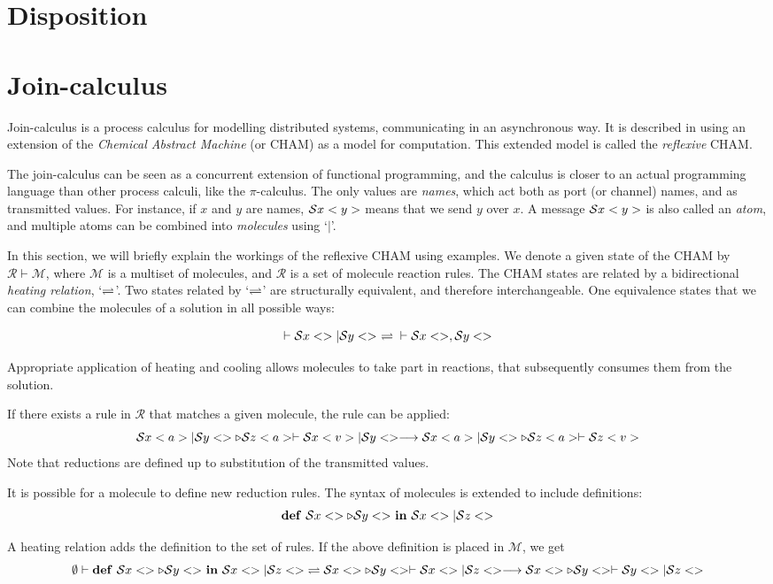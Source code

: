 \section{Disposition}


\section{Join-calculus}

Join-calculus is a process calculus for modelling distributed systems,
communicating in an asynchronous way. It is described in
\cite{fournet1996reflexive} using an extension of the \emph{Chemical Abstract
Machine}\cite{berry1989chemical} (or CHAM) as a model for computation. This
extended model is called the \emph{reflexive} CHAM.

The join-calculus can be seen as a concurrent extension of functional
programming, and the calculus is closer to an actual programming language than
other process calculi, like the $\pi$-calculus. The only values are
\emph{names}, which act both as port (or channel) names, and as transmitted
values. For instance, if $x$ and $y$ are names, $\S x<y>$ means that we send
$y$ over $x$. A message $\S x<y>$ is also called an \emph{atom}, and multiple
atoms can be combined into \emph{molecules} using `$|$'.

In this section, we will briefly explain the workings of the reflexive CHAM
using examples.  We denote a given state of the CHAM by $\mathcal{R} \vdash
\mathcal{M}$, where $\mathcal{M}$ is a multiset of molecules, and $\mathcal{R}$
is a set of molecule reaction rules. The CHAM states are related by a
bidirectional \emph{heating relation}, `$\HeatCool$'. Two states related by
`$\HeatCool$' are structurally equivalent, and therefore interchangeable.  One
equivalence states that we can combine the molecules of a solution in all
possible ways:

$$
  \vdash \S x<> | \S y<> \ \HeatCool{} \vdash \S x<>, \S y<>
$$

Appropriate application of heating and cooling allows molecules to take part in
reactions, that subsequently consumes them from the solution.

If there exists a rule in $\mathcal{R}$ that matches a given molecule, the rule
can be applied:
$$
  \S x<a> | \S y<> \triangleright \S z<a> \vdash \S x<v> | \S y<>
  \React \S x<a> | \S y<> \triangleright \S z<a> \vdash \S z<v>
$$
Note that reductions are defined up to substitution of the transmitted values.

It is possible for a molecule to define new reduction rules. The syntax of
molecules is extended to include definitions:
$$
  \jdef{\S x<> \triangleright \S y<>}{\S x<> | \S z<>}
$$

A heating relation adds the definition to the set of rules. If the above
definition is placed in $\mathcal{M}$, we get
$$
 \emptyset \vdash \Def \S x<> \triangleright \S y<> in \S x<> | \S z<>.
 \HeatCool \S x<> \triangleright \S y<> \vdash \S x<> | \S z<>
 \React \S x<> \triangleright \S y<> \vdash \S y<> | \S z<>
$$
